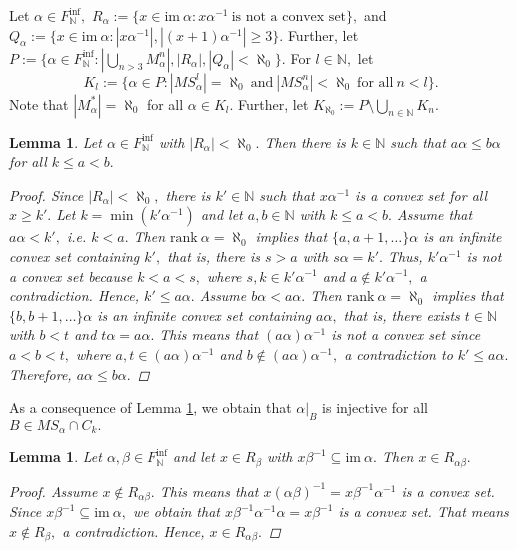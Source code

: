 \documentclass[11pt]{article}
\theoremstyle{plain}
\newtheorem{lemma}[theorem]{Lemma}
\theoremstyle{definition}
\newcommand{\rank}{\mathrm{rank~}}
\newcommand{\im}{\mathrm{im~}}
\begin{document}
Let $\alpha\in F_{\mathbb{N}}^{\inf},$ $R_{\alpha}:=\{x\in\im\alpha:x\alpha^{-1}~\text{is not a convex set}\},$ and $Q_{\alpha}:=\{x\in\im\alpha:\left\vert x\alpha^{-1}\right\vert,\left\vert (x+1)\alpha^{-1}\right\vert\geq 3\}.$
Further, let $P:=\{\alpha\in F_{\mathbb{N}}^{\inf}:\left\vert \bigcup_{n>3}M_{\alpha}^{n}\right\vert,\left\vert R_{\alpha}\right\vert,\left\vert Q_{\alpha}\right\vert<\aleph_{0}\}.$ For $l\in\mathbb{N},$ let $$K_{l}:=\{\alpha\in P:\left\vert MS_{\alpha}^{l}\right\vert=\aleph_{0}~\text{and}~\left\vert MS_{\alpha}^{n}\right\vert<\aleph_{0}~\text{for all}~n<l\}.$$ Note that $\left\vert M_{\alpha}^{*}\right\vert=\aleph_{0}$ for all $\alpha\in K_{l}.$ Further, let $K_{\aleph_{0}}:=P\setminus\bigcup_{n\in\mathbb{N}}K_{n}.$ 
\begin{lemma}\label{1}
Let $\alpha\in F_{\mathbb{N}}^{\inf}$ with $\left\vert R_{\alpha}\right\vert<\aleph_{0}.$ Then there is $k\in\mathbb{N}$ such that $a\alpha\leq b\alpha$ for all $k\leq a<b.$
\begin{proof}
Since $\left\vert R_{\alpha}\right\vert<\aleph_{0},$ there is $k'\in\mathbb{N}$ such that $x\alpha^{-1}$ is a convex set for all $x\geq k'.$ Let $k=\min(k'\alpha^{-1})$ and let $a,b\in\mathbb{N}$ with $k\leq a<b.$ Assume that $a\alpha<k',$ i.e. $k<a.$ Then $\rank\alpha=\aleph_{0}$ implies that $\{a,a+1,\ldots\}\alpha$ is an infinite convex set containing $k',$ that is, there is $s>a$ with $s\alpha=k'.$ Thus, $k'\alpha^{-1}$ is not a convex set because $k<a<s,$ where $s,k\in k'\alpha^{-1}$ and $a\not\in k'\alpha^{-1},$ a contradiction. Hence, $k'\leq a\alpha.$ Assume $b\alpha<a\alpha.$ Then $\rank\alpha=\aleph_{0}$ implies that $\{b,b+1,\ldots\}\alpha$ is an infinite convex set containing $a\alpha,$ that is, there exists $t\in \mathbb{N}$ with $b<t$ and $t\alpha=a\alpha.$ This means that $(a\alpha)\alpha^{-1}$ is not a convex set since $a<b<t,$ where $a,t\in(a\alpha)\alpha^{-1}$ and $b\not\in(a\alpha)\alpha^{-1},$ a contradiction to $k'\leq a\alpha.$ Therefore, $a\alpha\leq b\alpha.$
\end{proof}
\end{lemma}
As a consequence of Lemma \ref{1}, we obtain that $\alpha|_{B}$ is injective for all $B\in MS_{\alpha}\cap C_{k}.$
\begin{lemma}\label{2}
Let $\alpha,\beta\in F_{\mathbb{N}}^{\inf}$ and let $x\in R_{\beta}$ with $x\beta^{-1}\subseteq\im\alpha.$ Then $x\in R_{\alpha\beta}.$ 
\begin{proof}
Assume $x\not\in R_{\alpha\beta}.$ This means that $x(\alpha\beta)^{-1}=x\beta^{-1}\alpha^{-1}$ is a convex set. Since $x\beta^{-1}\subseteq \im\alpha,$ we obtain that $x\beta^{-1}\alpha^{-1}\alpha=x\beta^{-1}$ is a convex set. That means $x\not\in R_{\beta},$ a contradiction. Hence, $x\in R_{\alpha\beta}.$
\end{proof}
\end{lemma}
\end{document}
